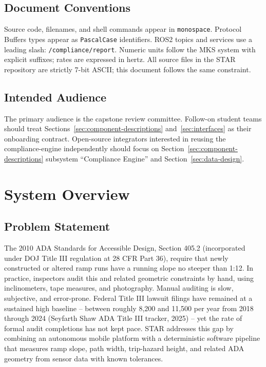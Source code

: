 \documentclass[11pt,letterpaper]{article}
\begin{document}
\subsection{Document Conventions}
Source code, filenames, and shell commands appear in
\texttt{monospace}. Protocol Buffers types appear as \texttt{PascalCase}
identifiers. ROS2 topics and services use a leading slash:
\texttt{/compliance/report}. Numeric units follow the MKS system with
explicit suffixes; rates are expressed in hertz. All source files in
the STAR repository are strictly 7-bit ASCII; this document follows
the same constraint.

\subsection{Intended Audience}
The primary audience is the capstone review committee. Follow-on
student teams should treat Sections~\ref{sec:component-descriptions}
and~\ref{sec:interfaces} as their onboarding contract. Open-source
integrators interested in reusing the compliance-engine independently
should focus on Section~\ref{sec:component-descriptions} subsystem
``Compliance Engine'' and Section~\ref{sec:data-design}.

\section{System Overview}
\label{sec:system-overview}

\subsection{Problem Statement}
The 2010 ADA Standards for Accessible Design, Section 405.2
(incorporated under DOJ Title III regulation at 28 CFR Part 36),
require that newly constructed or altered ramp runs have a running
slope no steeper than 1:12. In practice, inspectors audit this and
related geometric constraints by hand, using inclinometers, tape
measures, and photography. Manual auditing is slow, subjective, and
error-prone. Federal Title III lawsuit filings have remained at a
sustained high baseline -- between roughly 8{,}200 and 11{,}500 per
year from 2018 through 2024 (Seyfarth Shaw ADA Title III tracker,
2025) -- yet the rate of formal audit completions has not kept pace.
STAR addresses this gap by combining an autonomous mobile platform
with a deterministic software pipeline that measures ramp slope,
path width, trip-hazard height, and related ADA geometry from sensor
data with known tolerances.
\end{document}
